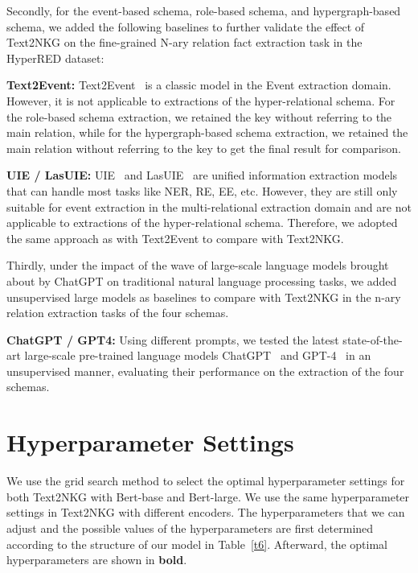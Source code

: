 \documentclass{article} \usepackage{iclr2024_conference,times}
\begin{document}
Secondly, for the event-based schema, role-based schema, and hypergraph-based schema, we added the following baselines to further validate the effect of Text2NKG on the fine-grained N-ary relation fact extraction task in the HyperRED dataset:

\textbf{Text2Event: }
Text2Event~\citep{HyperRED} is a classic model in the Event extraction domain. However, it is not applicable to extractions of the hyper-relational schema. For the role-based schema extraction, we retained the key without referring to the main relation, while for the hypergraph-based schema extraction, we retained the main relation without referring to the key to get the final result for comparison.

\textbf{UIE / LasUIE: }
UIE~\citep{UIE} and LasUIE~\citep{LasUIE} are unified information extraction models that can handle most tasks like NER, RE, EE, etc. However, they are still only suitable for event extraction in the multi-relational extraction domain and are not applicable to extractions of the hyper-relational schema. Therefore, we adopted the same approach as with Text2Event to compare with Text2NKG.

Thirdly, under the impact of the wave of large-scale language models brought about by ChatGPT on traditional natural language processing tasks, we added unsupervised large models as baselines to compare with Text2NKG in the n-ary relation extraction tasks of the four schemas.

\textbf{ChatGPT / GPT4: }
Using different prompts, we tested the latest state-of-the-art large-scale pre-trained language models ChatGPT~\citep{ChatGPT} and GPT-4~\citep{GPT-4} in an unsupervised manner, evaluating their performance on the extraction of the four schemas.


\section{Hyperparameter Settings}
\label{hyper}

We use the grid search method to select the optimal hyperparameter settings for both Text2NKG with Bert-base and Bert-large. We use the same hyperparameter settings in Text2NKG with different encoders. The hyperparameters that we can adjust and the possible values of the hyperparameters are first determined according to the structure of our model in Table~\ref{t6}. Afterward, the optimal hyperparameters are shown in \textbf{bold}.
\end{document}
